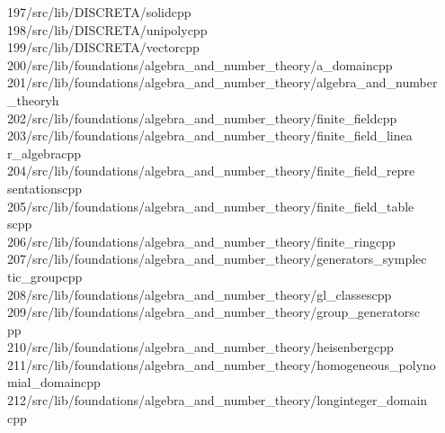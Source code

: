 \begin{tabbing}
197\>/src/lib/DISCRETA/solidcpp\\[0pt]
198\>/src/lib/DISCRETA/unipolycpp\\[0pt]
199\>/src/lib/DISCRETA/vectorcpp\\[0pt]
200\>/src/lib/foundations/algebra\_and\_number\_theory/a\_domaincpp\\[0pt]
201\>/src/lib/foundations/algebra\_and\_number\_theory/algebra\_and\_number\\[0pt]
\>\_theoryh\\[0pt]
202\>/src/lib/foundations/algebra\_and\_number\_theory/finite\_fieldcpp\\[0pt]
203\>/src/lib/foundations/algebra\_and\_number\_theory/finite\_field\_linea\\[0pt]
\>r\_algebracpp\\[0pt]
204\>/src/lib/foundations/algebra\_and\_number\_theory/finite\_field\_repre\\[0pt]
\>sentationscpp\\[0pt]
205\>/src/lib/foundations/algebra\_and\_number\_theory/finite\_field\_table\\[0pt]
\>scpp\\[0pt]
206\>/src/lib/foundations/algebra\_and\_number\_theory/finite\_ringcpp\\[0pt]
207\>/src/lib/foundations/algebra\_and\_number\_theory/generators\_symplec\\[0pt]
\>tic\_groupcpp\\[0pt]
208\>/src/lib/foundations/algebra\_and\_number\_theory/gl\_classescpp\\[0pt]
209\>/src/lib/foundations/algebra\_and\_number\_theory/group\_generatorsc\\[0pt]
\>pp\\[0pt]
210\>/src/lib/foundations/algebra\_and\_number\_theory/heisenbergcpp\\[0pt]
211\>/src/lib/foundations/algebra\_and\_number\_theory/homogeneous\_polyno\\[0pt]
\>mial\_domaincpp\\[0pt]
212\>/src/lib/foundations/algebra\_and\_number\_theory/longinteger\_domain\\[0pt]
\>cpp\\[0pt]

\end{tabbing}
